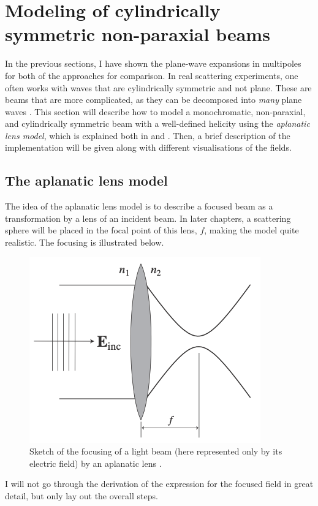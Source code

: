 \section{Modeling of cylindrically symmetric non-paraxial beams}

In the previous sections, I have shown the plane-wave expansions in multipoles for both of the approaches for comparison. In real scattering experiments, one often works with waves that are cylindrically symmetric and not plane. These are beams that are more complicated, as they can be decomposed into \textit{many} plane waves \cite{xavi}. 
This section will describe how to model a monochromatic, non-paraxial, and cylindrically symmetric beam with a well-defined helicity using the \textit{aplanatic lens model}, which is explained both in \cite{nanooptics} and \cite{xavi}. Then, a brief description of the implementation will be given along with different visualisations of the fields.

\subsection{The aplanatic lens model}
The idea of the aplanatic lens model is to describe a focused beam as a transformation by a lens of an incident beam. In later chapters, a scattering sphere will be placed in the focal point of this lens, \( f \), making the model quite realistic. The focusing is illustrated below.

\begin{figure}
    \includegraphics[width=0.5\linewidth]{Figures/aplanatic_lens.png}
    \caption{Sketch of the focusing of a light beam (here represented only by its electric field) by an aplanatic lens \cite{nanooptics}.}
    \label{fig:aplanatic}
\end{figure}

I will not go through the derivation of the expression for the focused field in great detail, but only lay out the overall steps.

